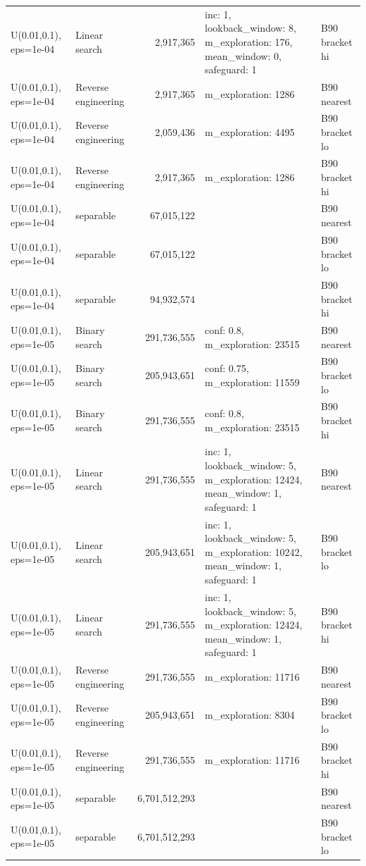 \begin{tabular}{llrll}
U(0.01,0.1), eps=1e-04 & Linear search & 2,917,365 & inc: 1, lookback\_window: 8, m\_exploration: 176, mean\_window: 0, safeguard: 1 & B90 bracket hi \\
U(0.01,0.1), eps=1e-04 & Reverse engineering & 2,917,365 & m\_exploration: 1286 & B90 nearest \\
U(0.01,0.1), eps=1e-04 & Reverse engineering & 2,059,436 & m\_exploration: 4495 & B90 bracket lo \\
U(0.01,0.1), eps=1e-04 & Reverse engineering & 2,917,365 & m\_exploration: 1286 & B90 bracket hi \\
U(0.01,0.1), eps=1e-04 & separable & 67,015,122 &  & B90 nearest \\
U(0.01,0.1), eps=1e-04 & separable & 67,015,122 &  & B90 bracket lo \\
U(0.01,0.1), eps=1e-04 & separable & 94,932,574 &  & B90 bracket hi \\
U(0.01,0.1), eps=1e-05 & Binary search & 291,736,555 & conf: 0.8, m\_exploration: 23515 & B90 nearest \\
U(0.01,0.1), eps=1e-05 & Binary search & 205,943,651 & conf: 0.75, m\_exploration: 11559 & B90 bracket lo \\
U(0.01,0.1), eps=1e-05 & Binary search & 291,736,555 & conf: 0.8, m\_exploration: 23515 & B90 bracket hi \\
U(0.01,0.1), eps=1e-05 & Linear search & 291,736,555 & inc: 1, lookback\_window: 5, m\_exploration: 12424, mean\_window: 1, safeguard: 1 & B90 nearest \\
U(0.01,0.1), eps=1e-05 & Linear search & 205,943,651 & inc: 1, lookback\_window: 5, m\_exploration: 10242, mean\_window: 1, safeguard: 1 & B90 bracket lo \\
U(0.01,0.1), eps=1e-05 & Linear search & 291,736,555 & inc: 1, lookback\_window: 5, m\_exploration: 12424, mean\_window: 1, safeguard: 1 & B90 bracket hi \\
U(0.01,0.1), eps=1e-05 & Reverse engineering & 291,736,555 & m\_exploration: 11716 & B90 nearest \\
U(0.01,0.1), eps=1e-05 & Reverse engineering & 205,943,651 & m\_exploration: 8304 & B90 bracket lo \\
U(0.01,0.1), eps=1e-05 & Reverse engineering & 291,736,555 & m\_exploration: 11716 & B90 bracket hi \\
U(0.01,0.1), eps=1e-05 & separable & 6,701,512,293 &  & B90 nearest \\
U(0.01,0.1), eps=1e-05 & separable & 6,701,512,293 &  & B90 bracket lo \\

\end{tabular}
